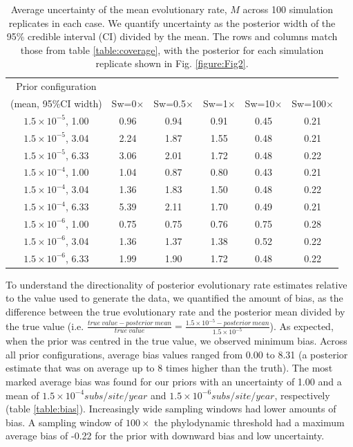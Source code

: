 \documentclass[11pt]{article}
\begin{document}
\begin{table}[H]
	\caption{Average uncertainty of the mean evolutionary rate, $M$ across 100 simulation replicates in each case. We quantify uncertainty as the posterior width of the 95\% credible interval (CI) divided by the mean. The rows and columns match those from table \ref{table:coverage}, with the posterior for each simulation replicate shown in Fig. \ref{figure:Fig2}.} 
	\begin{center} 
		\label{table:precision}
		\begin{tabular}{ c|c|c|c|c|c }
			Prior configuration\\(mean, 95\%CI width) &	Sw=0$\times$  & Sw=0.5$\times$ & Sw=1$\times$ & Sw=10$\times$ & Sw=100$\times$ \\			
			\hline
			$1.5\times10^{-5}$, 1.00 & 0.96 & 0.94 & 0.91 & 0.45 & 0.21\\
            $1.5\times10^{-5}$, 3.04 & 2.24 & 1.87 & 1.55 & 0.48 & 0.21\\
			$1.5\times10^{-5}$, 6.33 & 3.06 & 2.01 & 1.72 & 0.48 & 0.22\\
			\hline
			$1.5\times10^{-4}$, 1.00 & 1.04 & 0.87 & 0.80 & 0.43 & 0.21\\
            $1.5\times10^{-4}$, 3.04 & 1.36 & 1.83 & 1.50 & 0.48 & 0.22\\
			$1.5\times10^{-4}$, 6.33 & 5.39 & 2.11 & 1.70 & 0.49 & 0.21\\
			\hline
			$1.5\times10^{-6}$, 1.00 & 0.75 & 0.75 & 0.76 & 0.75 & 0.28\\
            $1.5\times10^{-6}$, 3.04 & 1.36 & 1.37 & 1.38 & 0.52 & 0.22\\
			$1.5\times10^{-6}$, 6.33 & 1.99 & 1.90 & 1.72 & 0.48 & 0.22\\
		\end{tabular}
	\end{center}
\end{table}

To understand the directionality of posterior evolutionary rate estimates relative to the value used to generate the data, we quantified the amount of bias, as the difference between the true evolutionary rate and the posterior mean divided by the true value (i.e. $\frac{true\ value-posterior\ mean}{true\ value}=\frac{1.5\times 10^{-5} - posterior\ mean}{1.5\times 10^{-5}}$). As expected, when the prior was centred in the true value, we observed minimum bias. Across all prior configurations, average bias values ranged from 0.00 to 8.31 (a posterior estimate that was on average up to 8 times higher than the truth). The most marked average bias was found for our priors with an uncertainty of 1.00 and a mean of $1.5\times 10^{-4} subs/site/year$ and $1.5\times 10^{-6} subs/site/year$, respectively (table \ref{table:bias}). Increasingly wide sampling windows had lower amounts of bias. A sampling window of $100\times$ the phylodynamic threshold had a maximum average bias of -0.22 for the prior with downward bias and low uncertainty.
\end{document}
